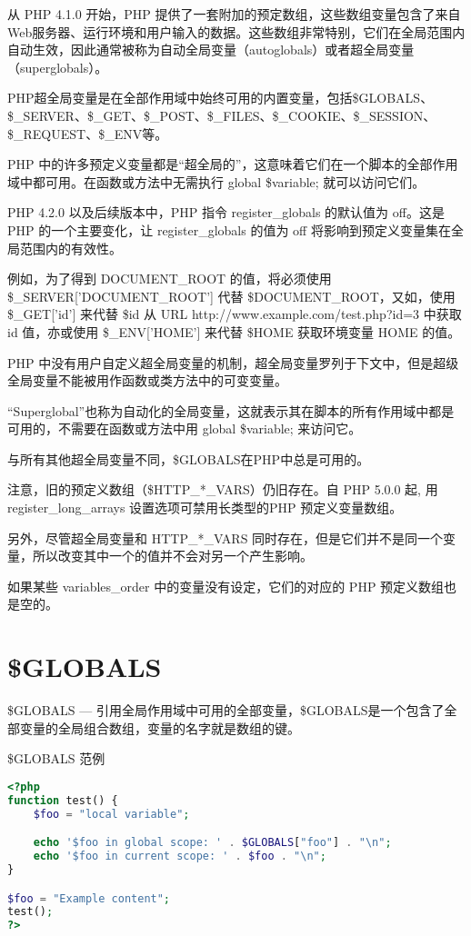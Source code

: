 从 PHP 4.1.0 开始，PHP 提供了一套附加的预定数组，这些数组变量包含了来自Web服务器、运行环境和用户输入的数据。这些数组非常特别，它们在全局范围内自动生效，因此通常被称为自动全局变量（autoglobals）或者超全局变量（superglobals）。

PHP超全局变量是在全部作用域中始终可用的内置变量，包括\$GLOBALS、\$\_SERVER、\$\_GET、\$\_POST、\$\_FILES、\$\_COOKIE、\$\_SESSION、\$\_REQUEST、\$\_ENV等。



PHP 中的许多预定义变量都是“超全局的”，这意味着它们在一个脚本的全部作用域中都可用。在函数或方法中无需执行 global \$variable; 就可以访问它们。

PHP 4.2.0 以及后续版本中，PHP 指令 register\_globals 的默认值为 off。这是 PHP 的一个主要变化，让 register\_globals 的值为 off 将影响到预定义变量集在全局范围内的有效性。

例如，为了得到 DOCUMENT\_ROOT 的值，将必须使用 \$\_SERVER['DOCUMENT\_ROOT'] 代替 \$DOCUMENT\_ROOT，又如，使用 \$\_GET['id'] 来代替 \$id 从 URL http://www.example.com/test.php?id=3 中获取 id 值，亦或使用 \$\_ENV['HOME'] 来代替 \$HOME 获取环境变量 HOME 的值。



PHP 中没有用户自定义超全局变量的机制，超全局变量罗列于下文中，但是超级全局变量不能被用作函数或类方法中的可变变量。

“Superglobal”也称为自动化的全局变量，这就表示其在脚本的所有作用域中都是可用的，不需要在函数或方法中用 global \$variable; 来访问它。

与所有其他超全局变量不同，\$GLOBALS在PHP中总是可用的。



注意，旧的预定义数组（\$HTTP\_*\_VARS）仍旧存在。自 PHP 5.0.0 起, 用 register\_long\_arrays 设置选项可禁用长类型的PHP 预定义变量数组。

另外，尽管超全局变量和 HTTP\_*\_VARS 同时存在，但是它们并不是同一个变量，所以改变其中一个的值并不会对另一个产生影响。

如果某些 variables\_order 中的变量没有设定，它们的对应的 PHP 预定义数组也是空的。




\section{\$GLOBALS}

\$GLOBALS — 引用全局作用域中可用的全部变量，\$GLOBALS是一个包含了全部变量的全局组合数组，变量的名字就是数组的键。


\begin{example}
\$GLOBALS 范例
\begin{lstlisting}[language=PHP]
<?php
function test() {
    $foo = "local variable";

    echo '$foo in global scope: ' . $GLOBALS["foo"] . "\n";
    echo '$foo in current scope: ' . $foo . "\n";
}

$foo = "Example content";
test();
?>
\end{lstlisting}
\end{example}

